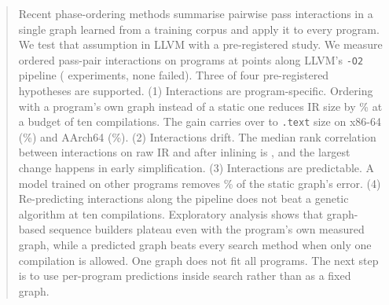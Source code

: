 \begin{abstract}
Recent phase-ordering methods summarise pairwise pass interactions in a single graph learned from
a training corpus and apply it to every program. We test that assumption in LLVM with a
pre-registered study. We measure \NPairs{} ordered pass-pair interactions on \NPrograms{} programs
at \NSnapshots{} points along LLVM's \texttt{-O2} pipeline (\NExperiments{} experiments, none
failed). Three of four pre-registered hypotheses are supported.
(1) Interactions are program-specific. Ordering with a program's own graph instead of a static
one reduces IR size by \HOnePct\% at a budget of ten compilations. The gain carries over to
\texttt{.text} size on x86-64 (\MSizeXPct\%) and AArch64 (\MSizeAPct\%).
(2) Interactions drift. The median rank correlation between interactions on raw IR and after
inlining is \HTwoRho, and the largest change happens in early simplification.
(3) Interactions are predictable. A model trained on other programs removes \HThreeGap\% of the
static graph's error.
(4) Re-predicting interactions along the pipeline does not beat a genetic algorithm at ten
compilations. Exploratory analysis shows that graph-based sequence builders plateau even with the
program's own measured graph, while a predicted graph beats every search method when only one
compilation is allowed. One graph does not fit all programs. The next step is to use per-program
predictions inside search rather than as a fixed graph.
\end{abstract}

